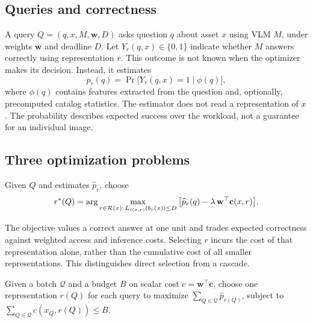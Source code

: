 \subsection{Queries and correctness}

A query $Q=(q,x,M,\mathbf{w},D)$ asks question $q$ about asset $x$ using VLM
$M$, under weights $\mathbf{w}$ and deadline $D$. Let
$Y_r(q,x)\in\{0,1\}$ indicate whether $M$ answers correctly using
representation $r$. This outcome is not known when the optimizer makes its
decision. Instead, it estimates
\begin{equation}
 p_r(q)=\Pr\big[Y_r(q,x)=1\mid\phi(q)\big],
 \label{eq:success}
\end{equation}
where $\phi(q)$ contains features extracted from the question and, optionally,
precomputed catalog statistics. The estimator does not read a representation
of $x$. The probability describes expected success over the workload, not a
guarantee for an individual image.

\subsection{Three optimization problems}

\begin{definition}
Given $Q$ and estimates $\widehat p_r$, choose
\begin{equation}
 r^*(Q)=\arg\max_{r\in\mathcal{R}(x):\,L_{\ell(x,r)}(b_r(x))\le D}
 \big[\widehat p_r(q)-\lambda\,\mathbf{w}^\top\mathbf{c}(x,r)\big].
 \label{eq:p1}
\end{equation}
\end{definition}

The objective values a correct answer at one unit and trades expected
correctness against weighted access and inference costs. Selecting $r$ incurs
the cost of that representation alone, rather than the cumulative cost of all
smaller representations. This distinguishes direct selection from a cascade.

\begin{definition}
Given a batch $\mathcal{Q}$ and a budget $B$ on scalar cost
$c=\mathbf{w}^\top\mathbf{c}$, choose one representation $r(Q)$ for each query
to maximize $\sum_{Q\in\mathcal{Q}}\widehat p_{r(Q)}$, subject to
$\sum_{Q\in\mathcal{Q}}c(x_Q,r(Q))\le B$.
\end{definition}

